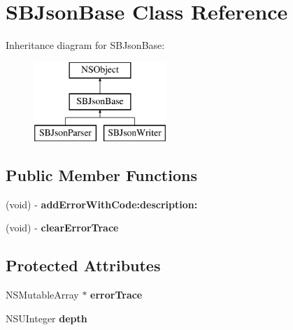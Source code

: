 \hypertarget{interface_s_b_json_base}{
\section{SBJsonBase Class Reference}
\label{interface_s_b_json_base}
}
Inheritance diagram for SBJsonBase:\begin{figure}[H]
\begin{center}
\leavevmode
\includegraphics[height=3.000000cm]{interface_s_b_json_base}
\end{center}
\end{figure}
\subsection*{Public Member Functions}
\begin{DoxyCompactItemize}
\item 
\hypertarget{interface_s_b_json_base_af6fc685c386c1c4528bd30b2bd630d56}{
(void) -\/ {\bfseries addErrorWithCode:description:}}
\label{interface_s_b_json_base_af6fc685c386c1c4528bd30b2bd630d56}

\item 
\hypertarget{interface_s_b_json_base_a6a429d6db2149fea7435b9e0aac5d3fa}{
(void) -\/ {\bfseries clearErrorTrace}}
\label{interface_s_b_json_base_a6a429d6db2149fea7435b9e0aac5d3fa}

\end{DoxyCompactItemize}
\subsection*{Protected Attributes}
\begin{DoxyCompactItemize}
\item 
\hypertarget{interface_s_b_json_base_a9fd64724d5da34a0f9842cee3d14620c}{
NSMutableArray $\ast$ {\bfseries errorTrace}}
\label{interface_s_b_json_base_a9fd64724d5da34a0f9842cee3d14620c}

\item 
\hypertarget{interface_s_b_json_base_a5e80155581d240f565ec4149ad812e03}{
NSUInteger {\bfseries depth}}
\label{interface_s_b_json_base_a5e80155581d240f565ec4149ad812e03}

\end{DoxyCompactItemize}

